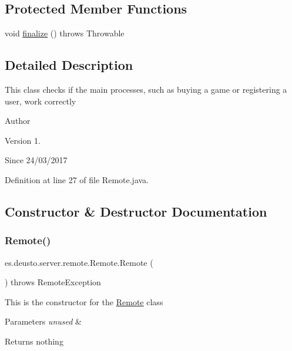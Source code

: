 \subsection*{Protected Member Functions}
\begin{DoxyCompactItemize}
\item 
void \hyperlink{classes_1_1deusto_1_1server_1_1remote_1_1_remote_ac8c5c24cdafa413da4ad7d71f7f710d3}{finalize} ()  throws Throwable 
\end{DoxyCompactItemize}


\subsection{Detailed Description}
This class checks if the main processes, such as buying a game or registering a user, work correctly \begin{DoxyAuthor}{Author}

\end{DoxyAuthor}
\begin{DoxyVersion}{Version}
1. 
\end{DoxyVersion}
\begin{DoxySince}{Since}
24/03/2017 
\end{DoxySince}


Definition at line 27 of file Remote.\+java.



\subsection{Constructor \& Destructor Documentation}
\mbox{\label{classes_1_1deusto_1_1server_1_1remote_1_1_remote_a39055ae30196c2afe97a621b80e43374}} 
\subsubsection{\texorpdfstring{Remote()}{Remote()}}
{\footnotesize\ttfamily es.\+deusto.\+server.\+remote.\+Remote.\+Remote (\begin{DoxyParamCaption}{ }\end{DoxyParamCaption}) throws Remote\+Exception}

This is the constructor for the \hyperlink{classes_1_1deusto_1_1server_1_1remote_1_1_remote}{Remote} class 
\begin{DoxyParams}{Parameters}
{\em unused} & \\
\hline
\end{DoxyParams}
\begin{DoxyReturn}{Returns}
nothing 
\end{DoxyReturn}

